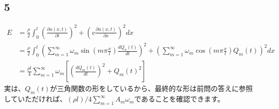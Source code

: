 \documentclass{jreport}
\begin{document}
\subsection{5}
\begin{equation}
	\begin{aligned}
		E&=\frac{\rho}{2} \int_0^l \left( \frac{\partial u(x,t)}{\partial t} \right)^2 +\left( v\frac{\partial u(x,t)}{\partial x} \right)^2 dx\\
		 &=\frac{\rho}{2} \int_0^l \left(\sum_{m=1}^{\infty} \omega_m \sin(m\pi \frac{x}{l} )\frac{dQ_n(t)}{dt} \right)^2 + \left( \sum_{m=1}^{\infty} \omega_m \cos(m\pi \frac{x}{l} )Q_m(t)\right) ^2 dx \\
		 &=\frac{\rho l}{4} \sum_{m=1}^{\infty} \omega_m \left[ \left(\frac{dQ_m(t)}{dt}\right)^2 +Q_m(t)^2 \right]
	\end{aligned}
\end{equation}
実は、$Q_m(t)$が三角関数の形をしているから、最終的な形は前問の答えに参照していただければ、$(\rho l)/4\sum_{m=1}^{\infty} A_m \omega_m$であることを確認できます。
\newpage
\end{document}
